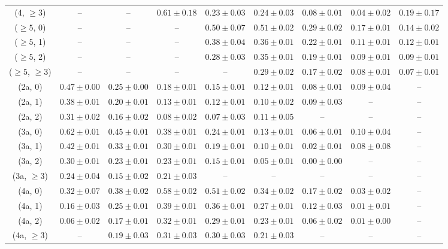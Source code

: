 \begin{table}[h!]
{\begin{tabular}{ccccccccc}
	(4, $\ge3$) & -- & -- & $0.61\pm 0.18$ & $0.23\pm 0.03$ & $0.24\pm 0.03$ & $0.08\pm 0.01$ & $0.04\pm 0.02$ & $0.19\pm 0.17$ \\[0.5ex] 
	($\ge5$, 0) & -- & -- & -- & $0.50\pm 0.07$ & $0.51\pm 0.02$ & $0.29\pm 0.02$ & $0.17\pm 0.01$ & $0.14\pm 0.02$ \\[0.5ex] 
	($\ge5$, 1) & -- & -- & -- & $0.38\pm 0.04$ & $0.36\pm 0.01$ & $0.22\pm 0.01$ & $0.11\pm 0.01$ & $0.12\pm 0.01$ \\[0.5ex] 
	($\ge5$, 2) & -- & -- & -- & $0.28\pm 0.03$ & $0.35\pm 0.01$ & $0.19\pm 0.01$ & $0.09\pm 0.01$ & $0.09\pm 0.01$ \\[0.5ex] 
	($\ge5$, $\ge3$) & -- & -- & -- & -- & $0.29\pm 0.02$ & $0.17\pm 0.02$ & $0.08\pm 0.01$ & $0.07\pm 0.01$ \\[0.5ex] 
	(2a, 0) & $0.47\pm 0.00$ & $0.25\pm 0.00$ & $0.18\pm 0.01$ & $0.15\pm 0.01$ & $0.12\pm 0.01$ & $0.08\pm 0.01$ & $0.09\pm 0.04$ & -- \\[0.5ex] 
	(2a, 1) & $0.38\pm 0.01$ & $0.20\pm 0.01$ & $0.13\pm 0.01$ & $0.12\pm 0.01$ & $0.10\pm 0.02$ & $0.09\pm 0.03$ & -- & -- \\[0.5ex] 
	(2a, 2) & $0.31\pm 0.02$ & $0.16\pm 0.02$ & $0.08\pm 0.02$ & $0.07\pm 0.03$ & $0.11\pm 0.05$ & -- & -- & -- \\[0.5ex] 
	(3a, 0) & $0.62\pm 0.01$ & $0.45\pm 0.01$ & $0.38\pm 0.01$ & $0.24\pm 0.01$ & $0.13\pm 0.01$ & $0.06\pm 0.01$ & $0.10\pm 0.04$ & -- \\[0.5ex] 
	(3a, 1) & $0.42\pm 0.01$ & $0.33\pm 0.01$ & $0.30\pm 0.01$ & $0.19\pm 0.01$ & $0.10\pm 0.01$ & $0.02\pm 0.01$ & $0.08\pm 0.08$ & -- \\[0.5ex] 
	(3a, 2) & $0.30\pm 0.01$ & $0.23\pm 0.01$ & $0.23\pm 0.01$ & $0.15\pm 0.01$ & $0.05\pm 0.01$ & $0.00\pm 0.00$ & -- & -- \\[0.5ex] 
	(3a, $\ge3$) & $0.24\pm 0.04$ & $0.15\pm 0.02$ & $0.21\pm 0.03$ & -- & -- & -- & -- & -- \\[0.5ex] 
	(4a, 0) & $0.32\pm 0.07$ & $0.38\pm 0.02$ & $0.58\pm 0.02$ & $0.51\pm 0.02$ & $0.34\pm 0.02$ & $0.17\pm 0.02$ & $0.03\pm 0.02$ & -- \\[0.5ex] 
	(4a, 1) & $0.16\pm 0.03$ & $0.25\pm 0.01$ & $0.39\pm 0.01$ & $0.36\pm 0.01$ & $0.27\pm 0.01$ & $0.12\pm 0.03$ & $0.01\pm 0.01$ & -- \\[0.5ex] 
	(4a, 2) & $0.06\pm 0.02$ & $0.17\pm 0.01$ & $0.32\pm 0.01$ & $0.29\pm 0.01$ & $0.23\pm 0.01$ & $0.06\pm 0.02$ & $0.01\pm 0.00$ & -- \\[0.5ex] 
	(4a, $\ge3$) & -- & $0.19\pm 0.03$ & $0.31\pm 0.03$ & $0.30\pm 0.03$ & $0.21\pm 0.03$ & -- & -- & -- \\[0.5ex] 

\end{tabular}}
\end{table}
